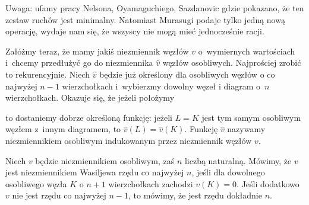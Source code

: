 Uwaga: ufamy pracy Nelsona, Oyamaguchiego, Sazdanovic \cite{sazdanovic2019} gdzie pokazano, że ten zestaw ruchów jest minimalny.
%
%
%
Natomiast Murasugi podaje tylko jedną nową operację, wydaje nam się, że wszyscy nie mogą mieć jednocześnie racji.

Załóżmy teraz, że mamy jakiś niezmiennik węzłów $v$ o~wymiernych wartościach i~chcemy przedłużyć go do niezmiennika $\hat v$ węzłów osobliwych.
Najprościej zrobić to rekurencyjnie.
Niech $\hat v$ będzie już określony dla osobliwych węzłów o co najwyżej $n - 1$ wierzchołkach i~wybierzmy dowolny węzeł i diagram o~$n$ wierzchołkach.
Okazuje się, że jeżeli położymy

to dostaniemy dobrze określoną funkcję: jeżeli $L = K$ jest tym samym osobliwym węzłem z~innym diagramem, to $\hat v(L) = \hat v(K)$.
Funkcję $\hat v$ nazywamy niezmiennikiem osobliwym indukowanym przez niezmiennik węzłów $v$.

\begin{definition}
\label{def:vassiliev_order}%
%
    Niech $v$ będzie niezmiennikiem osobliwym, zaś $n$ liczbą naturalną.
    Mówimy, że $v$ jest niezmiennikiem Wasiljewa rzędu co najwyżej $n$, jeśli dla dowolnego osobliwego węzła $K$ o $n + 1$ wierzchołkach zachodzi $v(K) = 0$.
    Jeśli dodatkowo $v$ nie jest rzędu co najwyżej $n - 1$, to mówimy, że jest rzędu dokładnie $n$.
\end{definition}

